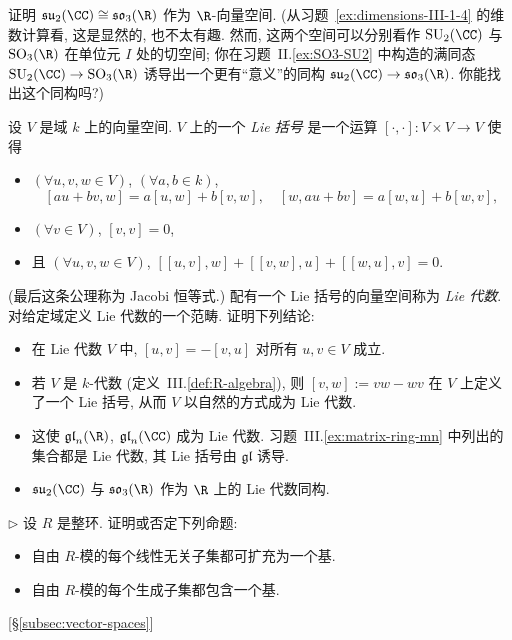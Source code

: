\begin{prob}
\label{ex:su2-so3-R-vector-space}
证明 $\mathfrak{su}_2(\CC)\cong\mathfrak{so}_3(\R)$ 作为 $\R$-向量空间. (从习题~\ref{ex:dimensions-III-1-4} 的维数计算看, 这是显然的, 也不太有趣. 然而, 这两个空间可以分别看作 $\mathrm{SU}_2(\CC)$ 与 $\mathrm{SO}_3(\R)$ 在单位元 $I$ 处的切空间; 你在习题~II.\ref{ex:SO3-SU2} 中构造的满同态 $\mathrm{SU}_2(\CC)\to\mathrm{SO}_3(\R)$ 诱导出一个更有``意义''的同构 $\mathfrak{su}_2(\CC)\to\mathfrak{so}_3(\R)$. 你能找出这个同构吗?)
\end{prob}

\begin{prob}
\label{ex:Lie-algebra-definition}
设 $V$ 是域 $k$ 上的向量空间. $V$ 上的一个 \emph{Lie 括号} 是一个运算 $[\cdot,\cdot]:V\times V\to V$ 使得
\begin{itemize}
\item $(\forall u,v,w\in V)$, $(\forall a,b\in k)$,
\[
[au+bv,w] = a[u,w] + b[v,w], \quad [w,au+bv] = a[w,u] + b[w,v],
\]
\item $(\forall v\in V)$, $[v,v]=0$,
\item 且 $(\forall u,v,w\in V)$, $[[u,v],w] + [[v,w],u] + [[w,u],v] = 0$.
\end{itemize}
(最后这条公理称为 Jacobi 恒等式.) 配有一个 Lie 括号的向量空间称为 \emph{Lie 代数}. 对给定域定义 Lie 代数的一个范畴. 证明下列结论:
\begin{itemize}
\item 在 Lie 代数 $V$ 中, $[u,v]=-[v,u]$ 对所有 $u,v\in V$ 成立.
\item 若 $V$ 是 $k$-代数 (定义~III.\ref{def:R-algebra}), 则 $[v,w]:=vw-wv$ 在 $V$ 上定义了一个 Lie 括号, 从而 $V$ 以自然的方式成为 Lie 代数.
\item 这使 $\mathfrak{gl}_n(\R)$, $\mathfrak{gl}_n(\CC)$ 成为 Lie 代数. 习题~III.\ref{ex:matrix-ring-mn} 中列出的集合都是 Lie 代数, 其 Lie 括号由 $\mathfrak{gl}$ 诱导.
\item $\mathfrak{su}_2(\CC)$ 与 $\mathfrak{so}_3(\R)$ 作为 $\R$ 上的 Lie 代数同构.
\end{itemize}
\end{prob}

\begin{prob}
\label{ex:basis-over-domain}
$\triangleright$ 设 $R$ 是整环. 证明或否定下列命题:
\begin{itemize}
\item 自由 $R$-模的每个线性无关子集都可扩充为一个基.
\item 自由 $R$-模的每个生成子集都包含一个基.
\end{itemize}
[§\ref{subsec:vector-spaces}]
\end{prob}

